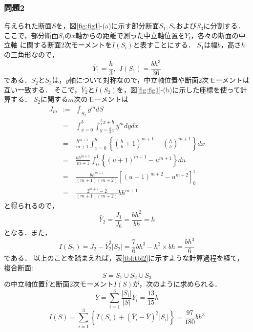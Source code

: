 \documentclass[10pt,a4j]{jarticle}
\begin{document}
\subsubsection*{問題2}
与えられた断面$S$を，図\ref{fig:fig1}-(a)に示す部分断面$S_1,S_2$および$S_3$に分割する．
ここで，部分断面$S_i$の$x$軸からの距離で測った中立軸位置を$\bar Y_i$，各々の断面の中立軸
に関する断面2次モーメントを$I(S_i)$と表すことにする．
$S_1$は幅$b$，高さ$h$の三角形なので，
\begin{equation}
	\bar Y_1 = \frac{h}{3}, \ \ I(S_1)=\frac{bh^3}{36}
\end{equation}
である．$S_2$と$S_3$は，$y$軸について対称なので，中立軸位置や断面2次モーメントは互い一致する．
そこで，$\bar Y_2$と$I(S_2)$を，図\ref{fig:fig1}-(b)に示した座標を使って計算する．
$S_2$に関する$m$次のモーメントは
\begin{eqnarray}
	J_m 
	&:=& 
	\int_{S_2} y^m dS \\
	&=& 
	\int_{x=0}^b\int_{y=\frac{h}{b}x}^{\frac{h}{b}x+h} y^m dydx \\
	&=& 
	\frac{h^{m+1}}{m+1}
	\int_{x=0}^b 
	\left\{ 
	\left( \frac{h}{b}+1\right)^{m+1} -
	\left( \frac{h}{b}\right)^{m+1} \right\} 
	dx  \\
	&=&
	\frac{bh^{m+1}}{m+1} \int_0^1 \left\{ (u+1)^{m+1}-u^{m+1}\right\}  du \\
	&=&
	\frac{bh^{m+1}}{(m+1)(m+2)} \left[ (u+1)^{m+2}-u^{m+2}\right]_0^1 \\
	&=&
	\frac{2^{m+2}-2}{(m+1)(m+2)}bh^{m+1}
\end{eqnarray}
と得られるので，
\begin{equation}
	\bar Y_2= \frac{J_1}{J_0}=\frac{bh^2}{bh}=h
\end{equation}
となる．また，
\begin{equation}
	I(S_2) =  J_2-\bar Y_2^2 \left| S_2 \right| = \frac{7}{6}bh^3 -h^2\times bh = \frac{bh^3}{6}
\end{equation}
である．
以上のことを踏まえれば，表\ref{tbl:tbl2}に示すような計算過程を経て，複合断面:
\begin{equation}
	S=S_1\cup S_2 \cup S_3
\end{equation}	
の中立軸位置$\bar Y$と断面2次モーメント$I(S)$が，次のように求められる．
\begin{equation}
	\bar Y = \sum_{i=1}^3 \frac{\left|S_i\right|}{\left| S \right|}\bar{Y}_i=\frac{13}{15}h
	\label{eqn:Yb2}
\end{equation}
\begin{equation}
	I(S)=\sum_{i=1}^3\left\{
		I(S_i)+\left( \bar Y_i -\bar Y\right)^2\left| S_i \right|
	\right\}
		=\frac{97}{180}bh^3
	\label{eqn:Iz_2}
\end{equation}
\end{document}
